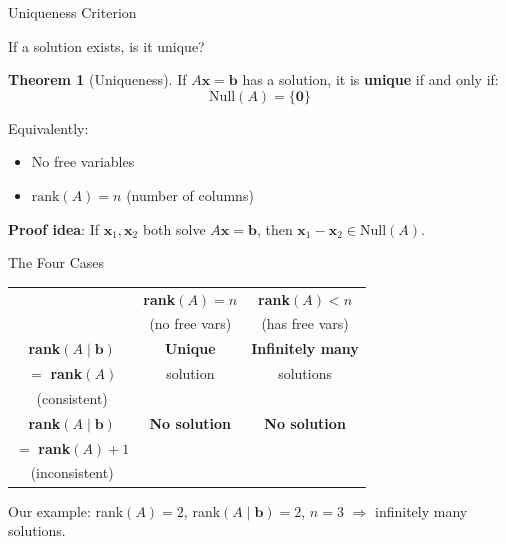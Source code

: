 \documentclass[10pt]{beamer}
\theoremstyle{definition}
\newtheorem{thm}{Theorem}[section]
\newcommand{\x}[1]{\alert{\textbf{#1}}}
\begin{document}
\begin{frame}{Uniqueness Criterion}

If a solution exists, is it unique?

\vspace{1em}

\begin{thm}[Uniqueness]
If $A\mathbf{x} = \mathbf{b}$ has a solution, it is \x{unique} if and only if:
$$\text{Null}(A) = \{\mathbf{0}\}$$

Equivalently:
\begin{itemize}
\item No free variables
\item $\text{rank}(A) = n$ (number of columns)
\end{itemize}
\end{thm}

\vspace{1em}

\x{Proof idea}: If $\mathbf{x}_1, \mathbf{x}_2$ both solve $A\mathbf{x}=\mathbf{b}$, then $\mathbf{x}_1 - \mathbf{x}_2 \in \text{Null}(A)$.

\end{frame}

\begin{frame}{The Four Cases}

\begin{center}
\begin{tabular}{c|c|c}
& \textbf{rank}$(A) = n$ & \textbf{rank}$(A) < n$ \\
& (no free vars) & (has free vars) \\
\hline
\textbf{rank}$(A \mid \mathbf{b})$ & \x{Unique} & \x{Infinitely many} \\
$= $ \textbf{rank}$(A)$ & solution & solutions \\
(consistent) & & \\
\hline
\textbf{rank}$(A \mid \mathbf{b})$ & \x{No solution} & \x{No solution} \\
$= $ \textbf{rank}$(A) + 1$ & & \\
(inconsistent) & & \\
\end{tabular}
\end{center}

\vspace{1em}

Our example: rank$(A)=2$, rank$(A \mid \mathbf{b})=2$, $n=3$ $\Rightarrow$ infinitely many solutions.

\end{frame}
\end{document}

